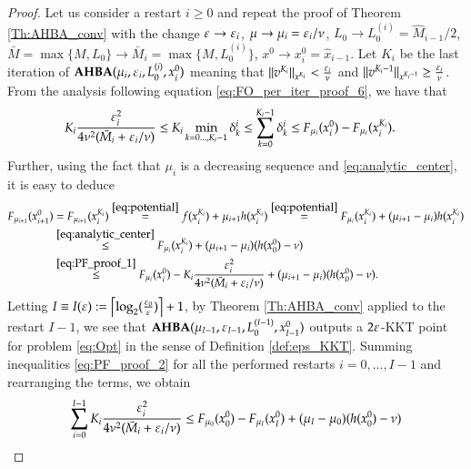 \begin{proof}
Let us consider a restart $i \geq 0$ and repeat the proof of Theorem \ref{Th:AHBA_conv} with the change $\varepsilon \to \varepsilon_i$,  $\mu \to \mu_i = \varepsilon_i/\nu$, $L_0 \to L_0^{(i)}=\hat{M}_{i-1}/2$, $\bar{M}=\max\{M,L_0\} \to \bar{M}_i=\max\{M,L_0^{(i)}\}$, $x^0 \to x^{0}_{i}=\hat{x}_{i-1}$.
Let $K_i$ be the last iteration of $\operatorname{\mathbf{AHBA}}(\mu_{i},\varepsilon_i,L_0^{(i)},x^{0}_{i})$ meaning that $\lVert v^{K_i}\rVert_{x^{K_i}} < \frac{\varepsilon_i}{\nu}$ and $\lVert v^{K_i-1}\rVert_{x^{K_i-1}} \geq \frac{\varepsilon_i}{\nu}$. From the analysis following equation \eqref{eq:FO_per_iter_proof_6}, we have that
\begin{align}
&K_i \frac{\varepsilon_i^{2}}{4 \nu^{2}(\bar{M}_i+\varepsilon_i/\nu)} \leq K_i \min_{k=0\ldots,K_i-1} \delta_{k}^i \leq  \sum_{k=0}^{K_i-1}\delta_{k}^i\leq F_{\mu_i}(x^{0}_i)-F_{\mu_i}(x^{K_i}_i). \label{eq:PF_proof_1} 
\end{align}
Further, using the fact that $\mu_i$ is a decreasing sequence and \eqref{eq:analytic_center}, it is easy to deduce
\begin{align}
F_{\mu_{i+1}}(x^{0}_{i+1})&=F_{\mu_{i+1}}(x^{K_i}_{i})\stackrel{\eqref{eq:potential}}{=}f(x^{K_i}_{i}) + \mu_{i+1} h(x^{K_i}_{i}) \stackrel{\eqref{eq:potential}}{=}F_{\mu_{i}}(x^{K_i}_{i}) + (\mu_{i+1} - \mu_{i}) h(x^{K_i}_{i}) \notag \\
&\stackrel{\eqref{eq:analytic_center}}{\leq} F_{\mu_{i}}(x^{K_i}_{i}) + (\mu_{i+1} - \mu_{i}) (h(x_0^0)-\nu)\notag \\
& \stackrel{\eqref{eq:PF_proof_1}}{\leq}F_{\mu_i}(x^{0}_i)-K_i \frac{\varepsilon_i^{2}}{4 \nu^{2}(\bar{M}_i+\varepsilon_i/\nu)} + (\mu_{i+1} - \mu_{i}) (h(x_0^0)-\nu).
\label{eq:PF_proof_2} 
\end{align}
Letting $I\equiv I(\varepsilon):=\left\lceil \log_2 (\frac{\varepsilon_0}{\varepsilon}) \right\rceil+1$, by Theorem \ref{Th:AHBA_conv} applied to the restart $I-1$, we see that $\operatorname{\mathbf{AHBA}}(\mu_{I-1},\varepsilon_{I-1},L_0^{(I-1)},x^{0}_{I-1})$ outputs a $2\varepsilon$-KKT point for problem \eqref{eq:Opt} in the sense of Definition \ref{def:eps_KKT}.
Summing inequalities \eqref{eq:PF_proof_2} for all the performed restarts $i=0,...,I-1$ and rearranging the terms, we obtain
\begin{align}
\sum_{i=0}^{I-1} K_i \frac{\eps_i^{2}}{4 \nu^{2}(\bar{M}_i+\eps_i/\nu)} & \leq F_{\mu_0}(x^{0}_0) - F_{\mu_{I}}(x^{0}_{I}) + (\mu_{I} - \mu_{0}) (h(x_0^0)-\nu) \notag \\

\end{align}
\end{proof}
